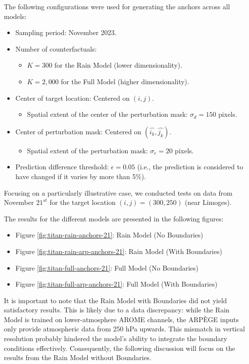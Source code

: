 The following configurations were used for generating the anchors across all models:
\begin{itemize}
    \item Sampling period: November 2023.
    \item Number of counterfactuals:
    \begin{itemize}
        \item $K = 300$ for the Rain Model (lower dimensionality).
        \item $K = 2,000$ for the Full Model (higher dimensionality).
    \end{itemize}
    \item Center of target location: Centered on $(i, j)$.
    \begin{itemize}
        \item Spatial extent of the center of the perturbation mask: $\sigma_d = 150$ pixels.
    \end{itemize}
    \item Center of perturbation mask: Centered on $(\widehat{i_k}, \widehat{j_k})$.
    \begin{itemize}
        \item Spatial extent of the perturbation mask: $\sigma_e = 20$ pixels.
    \end{itemize}
    \item Prediction difference threshold: $\epsilon = 0.05$ (i.e., the prediction is considered to have changed if it varies by more than 5\%).
\end{itemize}

Focusing on a particularly illustrative case, we conducted tests on data from November $21^{st}$ for the target location $(i, j) = (300, 250)$ (near Limoges).

The results for the different models are presented in the following figures:
\begin{itemize}
\item Figure \ref{fig:titan-rain-anchors-21}: Rain Model (No Boundaries)
\item Figure \ref{fig:titan-rain-arp-anchors-21}: Rain Model (With Boundaries)
\item Figure \ref{fig:titan-full-anchors-21}: Full Model (No Boundaries)
\item Figure \ref{fig:titan-full-arp-anchors-21}: Full Model (With Boundaries)
\end{itemize}

It is important to note that the Rain Model with Boundaries did not yield satisfactory results. This is likely due to a data discrepancy: while the Rain Model is trained on lower-atmosphere AROME channels, the ARPÈGE inputs only provide atmospheric data from 250 hPa upwards. This mismatch in vertical resolution probably hindered the model's ability to integrate the boundary conditions effectively. Consequently, the following discussion will focus on the results from the Rain Model without Boundaries.

